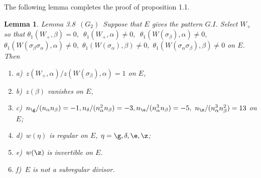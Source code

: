 \documentclass{memo-l}
\newtheorem{lemma}[theorem]{Lemma}
\theoremstyle{definition}
\theoremstyle{remark}
\numberwithin{section}{chapter}
\numberwithin{equation}{chapter}
\begin{document}
{\medskip}

The following lemma completes the proof of proposition 1.1.

\begin{lemma}{Lemma 3.8}\  $(G_{2})$\  Suppose that $E$ gives the pattern $G.I$.
 Select $W_{+}$ so that ${\theta}_{1}(W_{+},{\beta}) = 0,$\ ${\theta}_{1}(W_{+},
{\alpha})\ne 0,$\ ${\theta}_{1}(W({\sigma}_{\beta}),{\alpha})\ne 0,$
${\theta}_{1}(W({\sigma}_{\beta}{\sigma}_{\alpha}),{\alpha})\ne 0,$
${\theta}_{1}(W({\sigma}_{\alpha}),{\beta})\ne 0,$
${\theta}_{1}(W({\sigma}_{\alpha}{\sigma}_{\beta}),{\beta})\ne 0$ on $E$.
 Then
\begin{enumerate}
\item{a)}\   $z(W_{+},{\alpha})/z(W({\sigma}_{\beta}),{\alpha}) = 1$ on $E$,
\item{b)}\   $z({\beta})$ vanishes on $E$,
\item{c)}\   $n_{{\g}}/(n_{\alpha}n_{\beta}) = -1,
n_{{\delta}}/(n_{\alpha}^{2}n_{\beta}) = -3,
n_{{\e}}/(n_{\alpha}^{3}n_{\beta}) =-5,$
$n_{{\z}}/(n_{\alpha}^{3}n_{\beta}^{2}) = 13$ on $E$;
\item{d)}\   $w({\eta})$ is regular on $E$, ${\eta} = {\g},{\delta},{\e},
{\z}$;
\item{e)}\   $w({\z})$ is invertible on $E$.
\item{f)}\   $E$ is not a subregular divisor.
\end{enumerate}
\end{lemma}

\medskip
\end{document}
